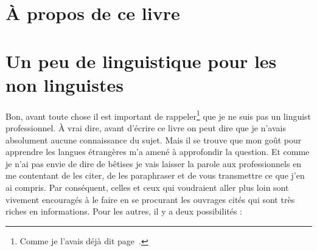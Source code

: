\documentclass[12pt,a4paper, xetex, hyperref]{book}
\begin{document}


\author{Laurent Garnier}




\dominitoc
{}


\frontmatter


\renewcommand{\epigraphflush}{flushleft}
\part{À propos de ce livre}

   \renewcommand{\epigraphflush}{flushright}

   \parttoc

   

   

   \newpage
   \listoffigures
   \listoftables
   \newpage

   \mainmatter
   \parttoc

\part{Un peu de linguistique pour les non linguistes}

    \newpage
    \minitoc
    \newpage

    Bon, avant toute chose il est important de rappeler\footnote{Comme je
      l'avais déjà dit page~\pageref{sec:phonetics}.} que je ne suis pas
    un \gls{linguist} professionnel. À vrai dire, avant d'écrire ce livre on
    peut dire que je n'avais absolument aucune connaissance du sujet. Mais
    il se trouve que mon goût pour apprendre les langues étrangères m'a
    amené à approfondir la question. Et comme je n'ai pas envie de dire de
    bêtises je vais laisser la parole aux professionnels en me contentant
    de les citer, de les paraphraser et de vous transmettre ce que j'en ai
    compris. Par conséquent, celles et ceux qui voudraient aller plus loin
    sont vivement encouragés à le faire en se procurant les ouvrages cités
    qui sont très riches en informations. Pour les autres, il y a deux
    possibilités :
    
\end{document}
